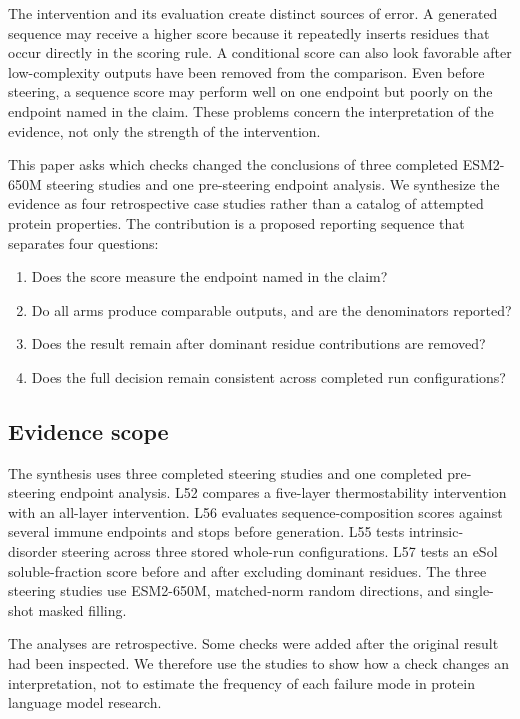 \documentclass{article}
\begin{document}
The intervention and its evaluation create distinct sources of error. A
generated sequence may receive a higher score because it repeatedly inserts
residues that occur directly in the scoring rule. A conditional score can also
look favorable after low-complexity outputs have been removed from the
comparison. Even before steering, a sequence score may perform well on one
endpoint but poorly on the endpoint named in the claim. These problems concern
the interpretation of the evidence, not only the strength of the intervention.

This paper asks which checks changed the conclusions of three completed
ESM2-650M steering studies and one pre-steering endpoint analysis. We
synthesize the evidence as four retrospective case studies rather than a
catalog of attempted protein properties. The contribution is a proposed
reporting sequence that separates four questions:

\begin{enumerate}
\item Does the score measure the endpoint named in the claim?
\item Do all arms produce comparable outputs, and are the denominators
reported?
\item Does the result remain after dominant residue contributions are
removed?
\item Does the full decision remain consistent across completed run
configurations?
\end{enumerate}

\subsection{Evidence scope}

The synthesis uses three completed steering studies and one completed
pre-steering endpoint analysis. L52 compares a five-layer thermostability
intervention with an all-layer intervention. L56 evaluates
sequence-composition scores against several immune endpoints and stops before
generation. L55 tests intrinsic-disorder steering across three stored
whole-run configurations. L57 tests an eSol soluble-fraction score before and
after excluding dominant residues. The three steering studies use ESM2-650M,
matched-norm random directions, and single-shot masked filling.

The analyses are retrospective. Some checks were added after the original
result had been inspected. We therefore use the studies to show how a check
changes an interpretation, not to estimate the frequency of each failure
mode in protein language model research.
\end{document}
